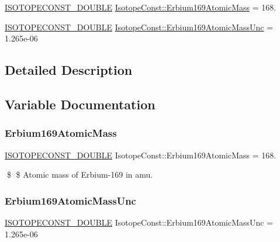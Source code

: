 \begin{DoxyCompactItemize}
\item 
\mbox{\hyperlink{group___isotope_const-_macros_ga8f45a7272ce02c0b4c65c44636ed719a}{I\+S\+O\+T\+O\+P\+E\+C\+O\+N\+S\+T\+\_\+\+D\+O\+U\+B\+LE}} \mbox{\hyperlink{group___isotope_const-_erbium-_er169_ga676c9fe1e53593f2a061f244b9ae7f9d}{Isotope\+Const\+::\+Erbium169\+Atomic\+Mass}} = 168.
\item 
\mbox{\hyperlink{group___isotope_const-_macros_ga8f45a7272ce02c0b4c65c44636ed719a}{I\+S\+O\+T\+O\+P\+E\+C\+O\+N\+S\+T\+\_\+\+D\+O\+U\+B\+LE}} \mbox{\hyperlink{group___isotope_const-_erbium-_er169_ga1c17c9e472592deace6a781723964b1d}{Isotope\+Const\+::\+Erbium169\+Atomic\+Mass\+Unc}} = 1.\+265e-\/06
\end{DoxyCompactItemize}


\subsection{Detailed Description}


\subsection{Variable Documentation}
\mbox{\label{group___isotope_const-_erbium-_er169_ga676c9fe1e53593f2a061f244b9ae7f9d}} 
\subsubsection{\texorpdfstring{Erbium169\+Atomic\+Mass}{Erbium169AtomicMass}}
{\footnotesize\ttfamily \mbox{\hyperlink{group___isotope_const-_macros_ga8f45a7272ce02c0b4c65c44636ed719a}{I\+S\+O\+T\+O\+P\+E\+C\+O\+N\+S\+T\+\_\+\+D\+O\+U\+B\+LE}} Isotope\+Const\+::\+Erbium169\+Atomic\+Mass = 168.}

\$ \$ Atomic mass of Erbium-\/169 in amu. \mbox{\label{group___isotope_const-_erbium-_er169_ga1c17c9e472592deace6a781723964b1d}} 
\subsubsection{\texorpdfstring{Erbium169\+Atomic\+Mass\+Unc}{Erbium169AtomicMassUnc}}
{\footnotesize\ttfamily \mbox{\hyperlink{group___isotope_const-_macros_ga8f45a7272ce02c0b4c65c44636ed719a}{I\+S\+O\+T\+O\+P\+E\+C\+O\+N\+S\+T\+\_\+\+D\+O\+U\+B\+LE}} Isotope\+Const\+::\+Erbium169\+Atomic\+Mass\+Unc = 1.\+265e-\/06}

